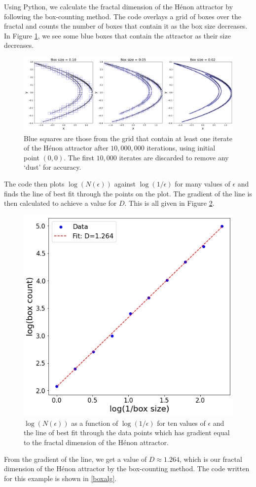 \begin{exmp}
    Using Python, we calculate the fractal dimension of the Hénon attractor by following the box-counting method. The code overlays a grid of boxes over the fractal and counts the number of boxes that contain it as the box size decreases. In Figure \ref{fig:Henon4}, we see some blue boxes that contain the attractor as their size decreases.
    \begin{figure}
        \centering
        \includegraphics[width=1\linewidth]{Images/Henon boxes.png}
        \caption{Blue squares are those from the grid that contain at least one iterate of the Hénon attractor after $10,000,000$ iterations, using initial point $(0,0)$. The first $10,000$ iterates are discarded to remove any `dust' for accuracy.}
        \label{fig:Henon4}
    \end{figure}
    The code then plots $\log (N(\epsilon))$ against $\log (1/\epsilon)$ for many values of $\epsilon$ and finds the line of best fit through the points on the plot. The gradient of the line is then calculated to achieve a value for $D$. This is all given in Figure \ref{fig:Henon5}.
    \begin{figure}
        \centering
        \includegraphics[width=0.5\linewidth]{Images/henon loglog.png}
        \caption{$\log (N(\epsilon))$ as a function of $\log(1/\epsilon)$ for ten values of $\epsilon$ and the line of best fit through the data points which has gradient equal to the fractal dimension of the Hénon attractor.}
        \label{fig:Henon5}
    \end{figure}
    From the gradient of the line, we get a value of $D\approx1.264$, which is our fractal dimension of the Hénon attractor by the box-counting method. The code written for this example is shown in \ref{boxalg}.
\end{exmp}
